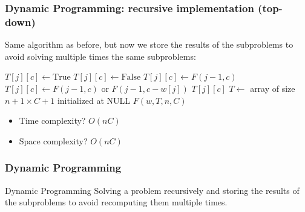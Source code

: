 \documentclass{beamer}
\begin{document}
\begin{frame}
  \frametitle{Dynamic Programming: recursive implementation (top-down)}

  \footnotesize
  Same algorithm as before, but now we store the results of the subproblems to avoid solving multiple times the same subproblems:
  \begin{minipage}[t]{0.70\linewidth}
    \footnotesize
    \begin{algorithmic}
      \State$T[j][c] \gets \text{True}$
      \Else{}
      \State$T[j][c] \gets \text{False}$
      \EndIf
      \State$T[j][c] \gets F(j - 1, c)$
      \Else{}
      \State$T[j][c] \gets F(j - 1, c) \text{ or } F(j - 1, c - w[j])$
      \EndIf
      \EndIf
      \State\Return$T[j][c]$
      \EndProcedure{}
      \State$T \gets$ array of size $n + 1 \times C + 1$ initialized at NULL
      \State\Return$F(w, T, n, C)$
      \EndProcedure{}
    \end{algorithmic}
  \end{minipage}
  \hfill
  \begin{minipage}[t]{0.25\linewidth}
    \footnotesize
    \begin{itemize}
      \item \pause Time complexity? \pause $O(nC)$
      \item \pause Space complexity? \pause $O(nC)$
    \end{itemize}
  \end{minipage}
\end{frame}

\begin{frame}
  \frametitle{Dynamic Programming}

  \begin{block}{Dynamic Programming}
    Solving a problem recursively and storing the results of the subproblems to avoid recomputing them multiple times.
  \end{block}
\end{frame}
\end{document}
